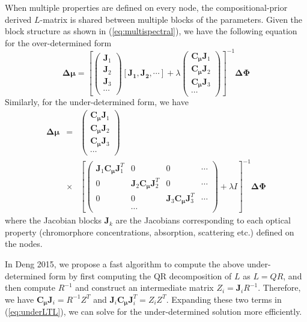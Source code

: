 \documentclass[12pt]{book}               %
\begin{document}
When multiple properties are defined on every node, the compositional-prior derived $L$-matrix is shared between multiple blocks of the parameters. Given the block structure as shown in (\ref{eq:multispectral}), we have the following equation for the over-determined form
\begin{equation}
\mathbf{\Delta\mu}=
\left[\left(\begin{array}{l}
\mathbf{J}_1\\
\mathbf{J}_2\\
\mathbf{J}_3\\
\cdots 
\end{array}\right)
[\mathbf{J_1, J_2},\cdots]+\lambda
\left(\begin{array}{l}
\mathbf{C_\mu}\mathbf{J}_1\\
\mathbf{C_\mu}\mathbf{J}_2\\
\mathbf{C_\mu}\mathbf{J}_3\\
\cdots 
\end{array}\right)\right]^{-1}\mathbf{\Delta\Phi}
\end{equation}
Similarly, for the under-determined form, we have
\begin{eqnarray}\label{eq:underLTL}
\mathbf{\Delta\mu}&=&
\left(\begin{array}{l}
\mathbf{C_\mu}\mathbf{J}_1\\
\mathbf{C_\mu}\mathbf{J}_2\\
\mathbf{C_\mu}\mathbf{J}_3\\
\cdots 
\end{array}\right)\\\nonumber
&\times& \left[
\left(\begin{array}{cccc}
\mathbf{J}_1\mathbf{C_\mu}\mathbf{J}^T_1 & 0 & 0 & \cdots\\
0& \mathbf{J}_2\mathbf{C_\mu}\mathbf{J}^T_2 & 0 & \cdots\\
0 & 0 & \mathbf{J}_3\mathbf{C_\mu}\mathbf{J}^T_3 & \cdots\\
& \cdots& 
\end{array}\right)
+\lambda I\right]^{-1}\mathbf{\Delta\Phi}
\end{eqnarray}
where the Jacobian blocks $\mathbf{J}_k$ are the Jacobians corresponding to each optical property (chromorphore concentrations, absorption, scattering etc.) defined on the nodes.

In Deng 2015, we propose a fast algorithm to compute the above under-determined form by first computing the QR decomposition of $L$ as $L=QR$, and then compute $R^{-1}$ and construct an intermediate matrix $Z_i=\mathbf{J}_iR^{-1}$. Therefore, we have $\mathbf{C_\mu}\mathbf{J}_i=R^{-1}Z^T$ and $\mathbf{J}_i\mathbf{C_\mu}\mathbf{J}^T_i=Z_iZ^T$. 
Expanding these two terms in (\ref{eq:underLTL}), we can solve for the under-determined solution more efficiently.
\end{document}
